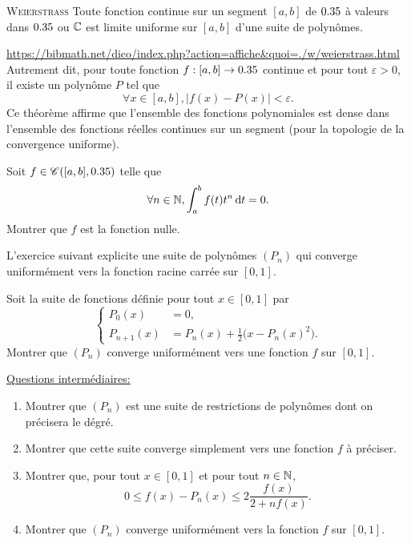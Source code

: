 \begin{theo}{\textsc{Weierstrass}}
    Toute fonction continue sur un segment $[a, b]$ de $0.35$ à valeurs dans $0.35$ ou $\mathbb{C}$ est limite uniforme sur $[a, b]$ d'une suite de polynômes.
\end{theo}

\url{https://bibmath.net/dico/index.php?action=affiche&quoi=./w/weierstrass.html} Autrement dit, pour toute fonction $f : [a, b] \to 0.35$ continue et pour tout $\varepsilon > 0$, il existe un polynôme $P$ tel que
$$\forall x \in [a, b], |f(x) - P(x)| < \varepsilon.$$
Ce théorème affirme que l'ensemble des fonctions polynomiales est dense dans l'ensemble des fonctions réelles continues sur un segment (pour la topologie de la convergence uniforme).

\begin{preuve}
\end{preuve} 

\begin{exercice}
    Soit $f \in \mathscr{C}([a, b], 0.35)$ telle que
    $$\forall n \in \mathbb{N}, \int_a^b f(t) t^n \, \mathrm{d} t = 0.$$
    Montrer que $f$ est la fonction nulle.
\end{exercice}

\begin{solution}

\end{solution}

L'exercice suivant explicite une suite de polynômes $(P_n)$ qui converge uniformément vers la fonction racine carrée sur $[0, 1]$.

\begin{exercice}
    Soit la suite de fonctions définie pour tout $x \in [0, 1]$ par
    $$
    \begin{cases}
        P_0(x) &= 0,\\
        P_{n+1}(x) &= P_n (x) + \frac{1}{2} \big( x-P_n (x)^2 \big).
    \end{cases}
    $$
    Montrer que $(P_n)$ converge uniformément vers une fonction $f$ sur $[0, 1]$.
\end{exercice}

\underline{Questions intermédiaires:} \\
\begin{enumerate}
    \item Montrer que $(P_n)$ est une suite de restrictions de polynômes dont on précisera le dégré.
    \item Montrer que cette suite converge simplement vers une fonction $f$ à préciser.
    \item Montrer que, pour tout $x \in [0, 1]$ et pour tout $n \in \mathbb{N}$,
    $$0 \leqslant f(x) - P_n(x) \leqslant 2 \frac{f(x)}{2 + nf(x)}.$$
    \item Montrer que $(P_n)$ converge uniformément vers la fonction $f$ sur $[0, 1]$.
\end{enumerate}

